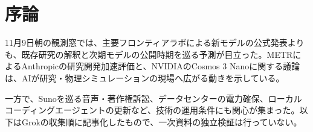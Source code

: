 \section{序論}
11月9日朝の観測窓では、主要フロンティアラボによる新モデルの公式発表よりも、既存研究の解釈と次期モデルの公開時期を巡る予測が目立った。METRによるAnthropicの研究開発加速評価と、NVIDIAのCosmos 3 Nanoに関する議論は、AIが研究・物理シミュレーションの現場へ広がる動きを示している。

一方で、Sunoを巡る音声・著作権訴訟、データセンターの電力確保、ローカルコーディングエージェントの更新など、技術の運用条件にも関心が集まった。以下はGrokの収集順に記事化したもので、一次資料の独立検証は行っていない。
